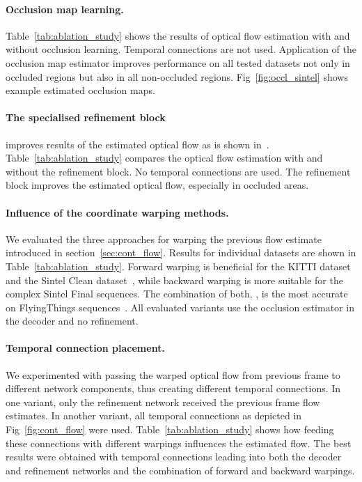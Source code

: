 \documentclass[runningheads]{llncs}
\begin{document}
\paragraph{\bf\textbf{Occlusion map learning.}} 
Table~\ref{tab:ablation_study} shows the results of optical flow estimation with and without occlusion learning.
Temporal connections are not used. Application of the occlusion map estimator improves performance on all tested datasets not only in occluded regions but also in all non-occluded regions.
Fig~\ref{fig:occl_sintel} shows example estimated occlusion maps.

\paragraph{\bf\textbf{The specialised refinement block}} improves results of  the estimated optical flow as is shown in~\cite{Ilg2016}.
Table~\ref{tab:ablation_study} compares the optical flow estimation with and without the refinement block. No temporal connections are used.
The refinement block improves the estimated optical flow, especially in occluded areas.


\paragraph{\bf\textbf{Influence of the coordinate warping methods.}}
We evaluated the three approaches for warping the previous flow estimate  introduced in section~\ref{sec:cont_flow}. Results for individual datasets are shown in Table~\ref{tab:ablation_study}. 
Forward warping  is beneficial for the KITTI dataset~\cite{Menze2015} and the Sintel Clean dataset~\cite{Butler2012}, while backward warping  is more suitable for the complex Sintel Final sequences.
The combination of both, ,  is the most accurate on FlyingThings sequences~\cite{Mayer2016}.
All evaluated variants use the occlusion estimator in the decoder and no refinement. 


\paragraph{\bf\textbf{Temporal connection placement.}}
We experimented with passing the warped optical flow from previous frame to different network components, thus creating different temporal connections.
In one variant, only the refinement network received the previous frame flow estimates. In another variant, all temporal connections as depicted in Fig~\ref{fig:cont_flow} were used.
Table~\ref{tab:ablation_study} shows how feeding these connections with different warpings influences the estimated flow.
The best results were obtained with temporal connections leading into both the decoder and refinement networks and the combination of forward and backward warpings.
\end{document}
